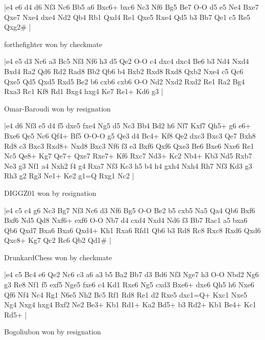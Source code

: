 \makegametitle
|e4 e6 d4 d6 Nf3 Nc6 Bb5 a6 Bxc6+ bxc6 Nc3 Nf6 Bg5 Be7 O-O d5 e5 Ne4 Bxe7 Qxe7 Nxe4 dxe4 Nd2 Qb4 Rb1 Qxd4 Re1 Qxe5 Rxe4 Qd5 b3 Bb7 Qe1 c5 Re5 Qxg2\#  |

\showboard

forthefighter won by checkmate

\makegametitle
|e4 e5 d3 Nc6 a3 Bc5 Nf3 Nf6 h3 d5 Qe2 O-O c4 dxc4 dxc4 Be6 b3 Nd4 Nxd4 Bxd4 Ra2 Qd6 Rd2 Rad8 Bb2 Qb6 b4 Bxb2 Rxd8 Rxd8 Qxb2 Nxe4 c5 Qc6 Qxe5 Qd5 Qxd5 Rxd5 Be2 b6 cxb6 cxb6 O-O Nd2 Nxd2 Rxd2 Re1 Ra2 Bg4 Rxa3 Rc1 Kf8 Rd1 Bxg4 hxg4 Ke7 Re1+ Kd6 g3  |

\showboard

Omar-Baroudi won by resignation

\makegametitle
|e4 d6 Nf3 e5 d4 f5 dxe5 fxe4 Ng5 d5 Nc3 Bb4 Bd2 h6 Nf7 Kxf7 Qh5+ g6 e6+ Bxe6 Qe5 Nc6 Qf4+ Bf5 O-O-O g5 Qe3 d4 Bc4+ Kf8 Qe2 dxc3 Bxc3 Qe7 Bxh8 Rd8 c3 Bxc3 Rxd8+ Nxd8 Bxc3 Nf6 f3 e3 Bxf6 Qxf6 Qxe3 Be6 Bxe6 Nxe6 Re1 Nc5 Qe8+ Kg7 Qe7+ Qxe7 Rxe7+ Kf6 Rxc7 Nd3+ Kc2 Nb4+ Kb3 Nd5 Rxb7 Ne3 g3 Nf1 a4 Nxh2 f4 g4 Rxa7 Nf3 Kc3 h5 b4 h4 gxh4 Nxh4 Rh7 Nf3 Kd3 g3 Rh3 g2 Rg3 Ne1+ Ke2 g1=Q Rxg1 Nc2  |

\showboard

DIGGZ01 won by resignation

\makegametitle
|e4 c5 c4 g6 Nc3 Bg7 Nf3 Nc6 d3 Nf6 Bg5 O-O Be2 b5 cxb5 Na5 Qa4 Qb6 Bxf6 Bxf6 Nd5 Qd8 Nxf6+ exf6 O-O Nb7 d4 cxd4 Nxd4 Nd6 f3 Bb7 Rac1 a5 bxa6 Qb6 Qxd7 Bxa6 Bxa6 Qxd4+ Kh1 Rxa6 Rfd1 Qb6 b3 Rd8 Rc8 Rxc8 Rxd6 Qxd6 Qxc8+ Kg7 Qc2 Rc6 Qb2 Qd1\#  |

\showboard

DrunkardChess won by checkmate

\makegametitle
|e4 c5 Bc4 e6 Qe2 Nc6 c3 a6 a3 b5 Ba2 Bb7 d3 Bd6 Nf3 Nge7 h3 O-O Nbd2 Ng6 g3 Re8 Nf1 f5 exf5 Nge5 fxe6 c4 Kd1 Rxe6 Ng5 cxd3 Bxe6+ dxe6 Qh5 h6 Nxe6 Qf6 Nf4 Nc4 Rg1 N6e5 Nh2 Bc5 Rf1 Rd8 Re1 d2 Rxe5 dxc1=Q+ Kxc1 Nxe5 Ng4 Nxg4 hxg4 Bxf2 Ne2 Be3+ Kb1 Rd1+ Ka2 Bd5+ b3 Rd2+ Kb1 Be4+ Kc1 Rd5+  |

\showboard

Bogoliubon won by resignation

